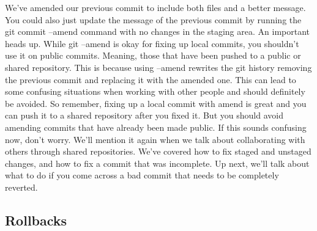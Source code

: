 	We've amended our previous commit to include both files and a better message. You could also just update the message of the previous commit by running the git commit --amend command with no changes in the staging area. An important heads up. While git --amend is okay for fixing up local commits, you shouldn't use it on public commits. Meaning, those that have been pushed to a public or shared repository. This is because using --amend rewrites the git history removing the previous commit and replacing it with the amended one. This can lead to some confusing situations when working with other people and should definitely be avoided. So remember, fixing up a local commit with amend is great and you can push it to a shared repository after you fixed it. But you should avoid amending commits that have already been made public. If this sounds confusing now, don't worry. We'll mention it again when we talk about collaborating with others through shared repositories. We've covered how to fix staged and unstaged changes, and how to fix a commit that was incomplete. Up next, we'll talk about what to do if you come across a bad commit that needs to be completely reverted.
	
	\subsection{Rollbacks}
	
